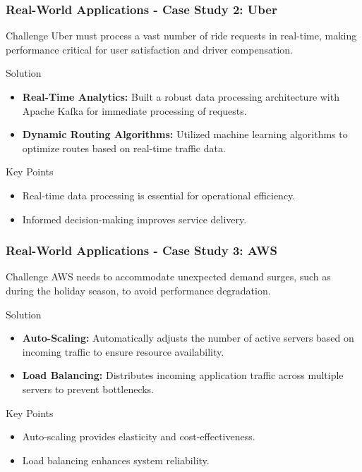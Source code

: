 \documentclass[aspectratio=169]{beamer}
\begin{document}
\begin{frame}[fragile]
    \frametitle{Real-World Applications - Case Study 2: Uber}
    \begin{block}{Challenge}
        Uber must process a vast number of ride requests in real-time, making performance critical for user satisfaction and driver compensation.
    \end{block}

    \begin{block}{Solution}
        \begin{itemize}
            \item \textbf{Real-Time Analytics:} Built a robust data processing architecture with Apache Kafka for immediate processing of requests.
            \item \textbf{Dynamic Routing Algorithms:} Utilized machine learning algorithms to optimize routes based on real-time traffic data.
        \end{itemize}
    \end{block}
    
    \begin{block}{Key Points}
        \begin{itemize}
            \item Real-time data processing is essential for operational efficiency.
            \item Informed decision-making improves service delivery.
        \end{itemize}
    \end{block}
\end{frame}

\begin{frame}[fragile]
    \frametitle{Real-World Applications - Case Study 3: AWS}
    \begin{block}{Challenge}
        AWS needs to accommodate unexpected demand surges, such as during the holiday season, to avoid performance degradation.
    \end{block}

    \begin{block}{Solution}
        \begin{itemize}
            \item \textbf{Auto-Scaling:} Automatically adjusts the number of active servers based on incoming traffic to ensure resource availability.
            \item \textbf{Load Balancing:} Distributes incoming application traffic across multiple servers to prevent bottlenecks.
        \end{itemize}
    \end{block}
    
    \begin{block}{Key Points}
        \begin{itemize}
            \item Auto-scaling provides elasticity and cost-effectiveness.
            \item Load balancing enhances system reliability.
        \end{itemize}
    \end{block}
\end{frame}
\end{document}
